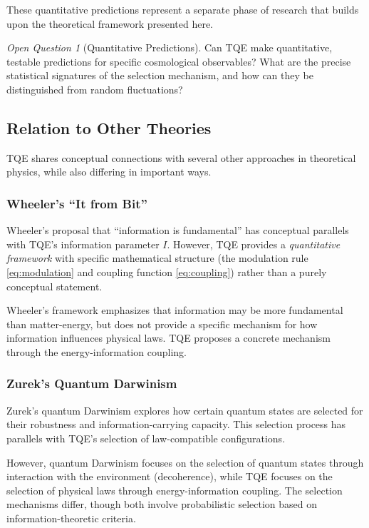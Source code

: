 \documentclass[12pt,a4paper]{article}
\theoremstyle{definition}
\theoremstyle{remark}
\newtheorem{question}{Open Question}[section]
\begin{document}
These quantitative predictions represent a separate phase of research that builds upon the theoretical framework presented here.

\begin{question}[Quantitative Predictions]
Can TQE make quantitative, testable predictions for specific cosmological observables? What are the precise statistical signatures of the selection mechanism, and how can they be distinguished from random fluctuations?
\end{question}

\subsection{Relation to Other Theories}

TQE shares conceptual connections with several other approaches in theoretical physics, while also differing in important ways.

\subsubsection{Wheeler's ``It from Bit''}

Wheeler's proposal that ``information is fundamental'' \cite{wheeler1990information} has conceptual parallels with TQE's information parameter $I$. However, TQE provides a \emph{quantitative framework} with specific mathematical structure (the modulation rule \eqref{eq:modulation} and coupling function \eqref{eq:coupling}) rather than a purely conceptual statement.

Wheeler's framework emphasizes that information may be more fundamental than matter-energy, but does not provide a specific mechanism for how information influences physical laws. TQE proposes a concrete mechanism through the energy-information coupling.

\subsubsection{Zurek's Quantum Darwinism}

Zurek's quantum Darwinism \cite{zurek2009quantum} explores how certain quantum states are selected for their robustness and information-carrying capacity. This selection process has parallels with TQE's selection of law-compatible configurations.

However, quantum Darwinism focuses on the selection of quantum states through interaction with the environment (decoherence), while TQE focuses on the selection of physical laws through energy-information coupling. The selection mechanisms differ, though both involve probabilistic selection based on information-theoretic criteria.
\end{document}
